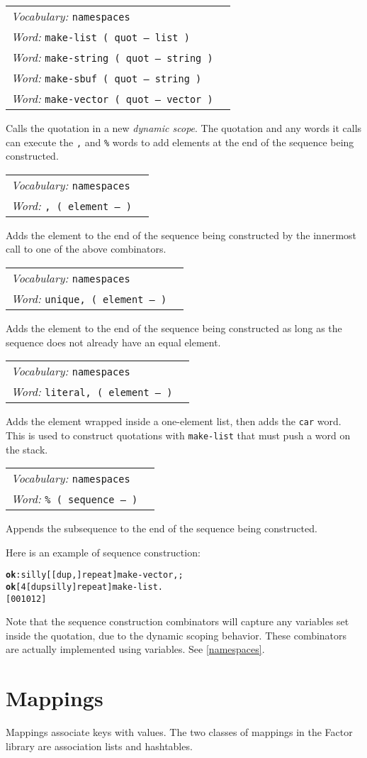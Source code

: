 \documentclass{book}
\newcommand{\tto}{\symbol{123}}
\newcommand{\ttc}{\symbol{125}}
\newcommand{\vocabulary}[1]{\emph{Vocabulary:} \texttt{#1}&\\}
\newcommand{\ordinaryword}[2]{\index{\texttt{#1}}\emph{Word:} \texttt{#2}&\\}
\newcommand{\wordtable}[1]{


\begin{tabularx}{12cm}{lX}
\hline
#1
\hline
\end{tabularx}

}
\begin{document}
\newcommand{\dynamicscopeglos}{}
\dynamicscopeglos
\wordtable{
\vocabulary{namespaces}
\ordinaryword{make-list}{make-list ( quot -- list )}
\ordinaryword{make-string}{make-string ( quot -- string )}
\ordinaryword{make-sbuf}{make-sbuf ( quot -- string )}
\ordinaryword{make-vector}{make-vector ( quot -- vector )}
}
Calls the quotation in a new \emph{dynamic scope}. The quotation and any words it calls can execute the \texttt{,} and \texttt{\%} words to add elements at the end of the sequence being constructed.
\wordtable{
\vocabulary{namespaces}
\ordinaryword{,}{,~( element -- )}
}
Adds the element to the end of the sequence being constructed by the innermost call to one of the above combinators.
\wordtable{
\vocabulary{namespaces}
\ordinaryword{unique,}{unique,~( element -- )}
}
Adds the element to the end of the sequence being constructed as long as the sequence does not already have an equal element.
\wordtable{
\vocabulary{namespaces}
\ordinaryword{literal,}{literal,~( element -- )}
}
Adds the element wrapped inside a one-element list, then adds the \texttt{car} word. This is used to construct quotations with \texttt{make-list} that must push a word on the stack.
\wordtable{
\vocabulary{namespaces}
\ordinaryword{\%}{\% ( sequence -- )}
}
Appends the subsequence to the end of the sequence being constructed.

Here is an example of sequence construction:
\begin{alltt}
\textbf{ok} : silly [ [ dup , ] repeat ] make-vector , ;
\textbf{ok} [ 4 [ dup silly ] repeat ] make-list .
[ \tto \ttc \tto 0 \ttc \tto 0 1 \ttc \tto 0 1 2 \ttc ]
\end{alltt}

Note that the sequence construction combinators will capture any variables set inside the quotation, due to the dynamic scoping behavior. These combinators are actually implemented using variables. See \ref{namespaces}.

\section{Mappings}


Mappings associate keys with values. The two classes of mappings in the Factor library are association lists and hashtables.
\end{document}
